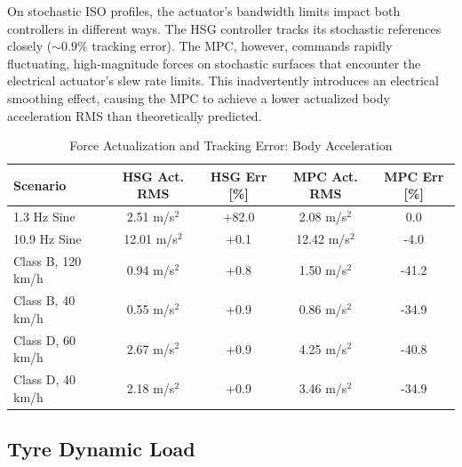 On stochastic ISO profiles, the actuator's bandwidth limits impact both controllers in different ways. The HSG controller tracks its stochastic references closely ($\sim 0.9\%$ tracking error). The MPC, however, commands rapidly fluctuating, high-magnitude forces on stochastic surfaces that encounter the electrical actuator's slew rate limits. This inadvertently introduces an electrical smoothing effect, causing the MPC to achieve a lower actualized body acceleration RMS than theoretically predicted.

\begin{table}[H]
    \centering
    \caption{Force Actualization and Tracking Error: Body Acceleration}
    \label{tab:act_ba_metrics}
    \renewcommand{\arraystretch}{1.2}
    \begin{tabular}{lcccc}
        \toprule
        \textbf{Scenario} & \textbf{HSG Act. RMS} & \textbf{HSG Err [\%]} & \textbf{MPC Act. RMS} & \textbf{MPC Err [\%]} \\
        \midrule
        1.3 Hz Sine      & 2.51 m/s$^2$ & +82.0 & 2.08 m/s$^2$ & \phantom{-}0.0 \\
        10.9 Hz Sine     & 12.01 m/s$^2$& +0.1  & 12.42 m/s$^2$& -4.0 \\
        Class B, 120 km/h& 0.94 m/s$^2$ & +0.8  & 1.50 m/s$^2$ & -41.2 \\
        Class B, 40 km/h & 0.55 m/s$^2$ & +0.9  & 0.86 m/s$^2$ & -34.9 \\
        Class D, 60 km/h & 2.67 m/s$^2$ & +0.9  & 4.25 m/s$^2$ & -40.8 \\
        Class D, 40 km/h & 2.18 m/s$^2$ & +0.9  & 3.46 m/s$^2$ & -34.9 \\
        \bottomrule
    \end{tabular}
\end{table}

\subsection{Tyre Dynamic Load}
